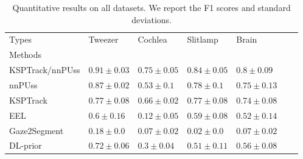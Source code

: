 \begin{table*}[t]
\centering
\caption{
    Quantitative results on all datasets. We report the F1 scores and standard deviations.
    }
\label{tab:results}
\begin{tabular}{llp{1.8cm}p{1.8cm}p{1.8cm}p{1.8cm}p{1.8cm}}
\toprule
Types &               Tweezer &               Cochlea &              Slitlamp &                Brain \\
Methods         &                       &                       &                       &                      \\
\midrule
KSPTrack/nnPUss &  $\bm{0.91} \pm 0.03$ &  $\bm{0.75} \pm 0.05$ &  $\bm{0.84} \pm 0.05$ &  $\bm{0.8} \pm 0.09$ \\
nnPUss          &       $0.87 \pm 0.02$ &        $0.53 \pm 0.1$ &        $0.78 \pm 0.1$ &      $0.75 \pm 0.13$ \\
\hdashline
KSPTrack        &       $0.77 \pm 0.08$ &       $0.66 \pm 0.02$ &       $0.77 \pm 0.08$ &      $0.74 \pm 0.08$ \\
EEL             &        $0.6 \pm 0.16$ &       $0.12 \pm 0.05$ &       $0.59 \pm 0.08$ &      $0.52 \pm 0.14$ \\
Gaze2Segment    &        $0.18 \pm 0.0$ &       $0.07 \pm 0.02$ &        $0.02 \pm 0.0$ &      $0.07 \pm 0.02$ \\
DL-prior        &       $0.72 \pm 0.06$ &        $0.3 \pm 0.04$ &       $0.51 \pm 0.11$ &      $0.56 \pm 0.08$ \\
\bottomrule
\end{tabular}
\end{table*}
